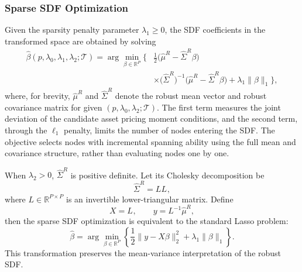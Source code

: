 \documentclass[12pt]{article}
\def\bm#1{#1}%
\def\top{}%
\begin{document}
\subsubsection{Sparse SDF Optimization}

Given the sparsity penalty parameter \(\lambda_1\geq0\), the SDF coefficients in the transformed space are obtained by solving
\begin{equation}
  \begin{aligned}
  \widehat{\bm\beta}(p,\lambda_0,\lambda_1,\lambda_2;\mathcal T)
  =\arg\min_{\bm\beta\in\mathbb R^P}
  \Bigg\{&
  \frac{1}{2}
  \bigl(
    \widehat{\bm\mu}^{R}
    -\widehat{\bm\Sigma}^{R}\bm\beta
  \bigr)^{\top}\\
  &\times
  \bigl(\widehat{\bm\Sigma}^{R}\bigr)^{-1}
  \bigl(
    \widehat{\bm\mu}^{R}
    -\widehat{\bm\Sigma}^{R}\bm\beta
  \bigr)
  +\lambda_1\|\bm\beta\|_1
  \Bigg\},
  \end{aligned}
  \label{eq:sparse_sdf_objective}
\end{equation}
where, for brevity, \(\widehat{\bm\mu}^{R}\) and \(\widehat{\bm\Sigma}^{R}\) denote the robust mean vector and robust covariance matrix for given \((p,\lambda_0,\lambda_2;\mathcal T)\). The first term measures the joint deviation of the candidate asset pricing moment conditions, and the second term, through the \(\ell_1\) penalty, limits the number of nodes entering the SDF. The objective selects nodes with incremental spanning ability using the full mean and covariance structure, rather than evaluating nodes one by one.

When \(\lambda_2>0\), \(\widehat{\bm\Sigma}^{R}\) is positive definite. Let its Cholesky decomposition be
\begin{equation}
  \widehat{\bm\Sigma}^{R}
  =
  \bm L\bm L^{\top},
  \label{eq:cholesky}
\end{equation}
where \(\bm L\in\mathbb R^{P\times P}\) is an invertible lower-triangular matrix. Define
\begin{equation}
  \bm X=\bm L^{\top},
  \qquad
  \bm y=\bm L^{-1}\widehat{\bm\mu}^{R},
  \label{eq:gls_transform}
\end{equation}
then the sparse SDF optimization is equivalent to the standard Lasso problem:
\begin{equation}
  \widehat{\bm\beta}
  =
  \arg\min_{\bm\beta\in\mathbb R^P}
  \left\{
    \frac{1}{2}
    \|\bm y-\bm X\bm\beta\|_2^2
    +\lambda_1\|\bm\beta\|_1
  \right\}.
  \label{eq:lasso_standard}
\end{equation}
This transformation preserves the mean-variance interpretation of the robust SDF.
\end{document}

